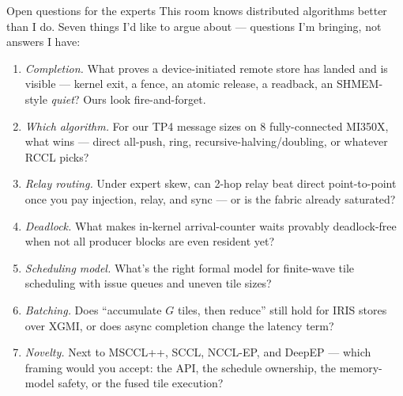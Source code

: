 \documentclass[pdf,aspectratio=169]{beamer}
\newcommand{\empy}[1]{{\color{darkorange}\emph{#1}}}
\begin{document}
\begin{frame}{Open questions for the experts}
\small
This room knows distributed algorithms better than I do. Seven things I'd like to argue about --- questions I'm bringing, not answers I have:
\vspace{0.2ex}
\begin{enumerate}\footnotesize\setlength{\itemsep}{1pt}
  \item \empy{Completion.} What proves a device-initiated remote store has landed and is visible --- kernel exit, a fence, an atomic release, a readback, an SHMEM-style \emph{quiet}? Ours look fire-and-forget.
  \item \empy{Which algorithm.} For our TP4 message sizes on 8 fully-connected MI350X, what wins --- direct all-push, ring, recursive-halving/doubling, or whatever RCCL picks?
  \item \empy{Relay routing.} Under expert skew, can 2-hop relay beat direct point-to-point once you pay injection, relay, and sync --- or is the fabric already saturated?
  \item \empy{Deadlock.} What makes in-kernel arrival-counter waits provably deadlock-free when not all producer blocks are even resident yet?
  \item \empy{Scheduling model.} What's the right formal model for finite-wave tile scheduling with issue queues and uneven tile sizes?
  \item \empy{Batching.} Does ``accumulate $G$ tiles, then reduce'' still hold for IRIS stores over XGMI, or does async completion change the latency term?
  \item \empy{Novelty.} Next to MSCCL++, SCCL, NCCL-EP, and DeepEP --- which framing would you accept: the API, the schedule ownership, the memory-model safety, or the fused tile execution?
\end{enumerate}
\end{frame}
\end{document}
